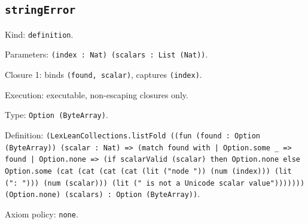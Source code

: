 \documentclass[11pt]{article}
\begin{document}
\subsection*{\texttt{stringError}}
\noindent Kind: \texttt{definition}.\par
\noindent Parameters: \texttt{(index : Nat) (scalars : List (Nat))}.\par
\noindent Closure 1: binds \texttt{(found, scalar)}, captures \texttt{(index)}.\par
\noindent Execution: executable, non-escaping closures only.\par
\noindent Type: \texttt{Option (ByteArray)}.\par
\noindent Definition: \texttt{(LexLeanCollections.listFold ((fun (found : Option (ByteArray)) (scalar : Nat) => (match found with | Option.some \_ => found | Option.none => (if scalarValid (scalar) then Option.none else Option.some (cat (cat (cat (cat (lit ("node ")) (num (index))) (lit (": "))) (num (scalar))) (lit (" is not a Unicode scalar value"))))))) (Option.none) (scalars) : Option (ByteArray))}.\par
\noindent Axiom policy: \texttt{none}.\par
\end{document}
